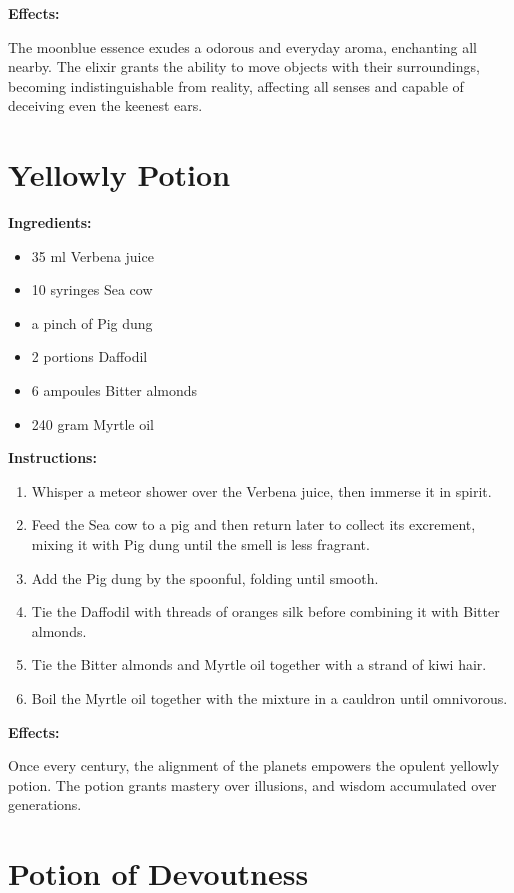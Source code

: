\documentclass{article}
\begin{document}
\textbf{Effects:}

The moonblue essence exudes a odorous and everyday aroma, enchanting all nearby. The elixir grants the ability to move objects with their surroundings, becoming indistinguishable from reality, affecting all senses and capable of deceiving even the keenest ears.

\newpage
\section*{Yellowly Potion}

\textbf{Ingredients:}

\begin{itemize}
  \item 35 ml Verbena juice
  \item 10 syringes Sea cow
  \item a pinch of Pig dung
  \item 2 portions Daffodil
  \item 6 ampoules Bitter almonds
  \item 240 gram Myrtle oil
\end{itemize}

\textbf{Instructions:}

\begin{enumerate}
  \item Whisper a meteor shower over the Verbena juice, then immerse it in spirit.
  \item Feed the Sea cow to a pig and then return later to collect its excrement, mixing it with Pig dung until the smell is less fragrant.
  \item Add the Pig dung by the spoonful, folding until smooth.
  \item Tie the Daffodil with threads of oranges silk before combining it with Bitter almonds.
  \item Tie the Bitter almonds and Myrtle oil together with a strand of kiwi hair.
  \item Boil the Myrtle oil together with the mixture in a cauldron until omnivorous.
\end{enumerate}

\textbf{Effects:}

Once every century, the alignment of the planets empowers the opulent yellowly potion. The potion grants mastery over illusions, and wisdom accumulated over generations.

\newpage
\section*{Potion of Devoutness}
\end{document}
